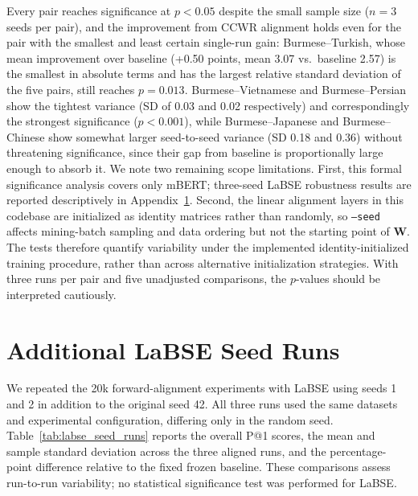 \documentclass[11pt]{article}
\begin{document}
Every pair reaches significance at $p<0.05$ despite the small sample size ($n=3$ seeds per pair), and the improvement from CCWR alignment holds even for the pair with the smallest and least certain single-run gain: Burmese--Turkish, whose mean improvement over baseline (+0.50 points, mean 3.07 vs.\ baseline 2.57) is the smallest in absolute terms and has the largest relative standard deviation of the five pairs, still reaches $p=0.013$. Burmese--Vietnamese and Burmese--Persian show the tightest variance (SD of 0.03 and 0.02 respectively) and correspondingly the strongest significance ($p<0.001$), while Burmese--Japanese and Burmese--Chinese show somewhat larger seed-to-seed variance (SD 0.18 and 0.36) without threatening significance, since their gap from baseline is proportionally large enough to absorb it. We note two remaining scope limitations. First, this formal significance analysis covers only mBERT; three-seed LaBSE robustness results are reported descriptively in Appendix~\ref{app:labse_seeds}. Second, the linear alignment layers in this codebase are
initialized as identity matrices rather than randomly, so
\texttt{--seed} affects mining-batch sampling and data
ordering but not the starting point of $\mathbf{W}$.
The tests therefore quantify variability under the
implemented identity-initialized training procedure,
rather than across alternative initialization strategies. With three runs per pair and five unadjusted comparisons, the $p$-values should be interpreted cautiously.

\section{Additional LaBSE Seed Runs}
\label{app:labse_seeds}

We repeated the 20k forward-alignment experiments with LaBSE using seeds 1 and 2 in addition to the original seed 42. All three runs used the same datasets and experimental configuration, differing only in the random seed. Table~\ref{tab:labse_seed_runs} reports the overall P@1 scores, the mean and sample standard deviation across the three aligned runs, and the percentage-point difference relative to the fixed frozen baseline. These comparisons assess run-to-run variability; no statistical significance test was performed for LaBSE.
\end{document}
